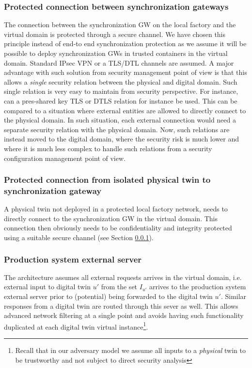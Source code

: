 \subsubsection{Protected connection between synchronization gateways} 
\label{dtwinsecurity:arch_protected_connection}
The connection between the synchronization GW on the local factory and the virtual domain is protected through a secure channel. We have chosen this principle instead of end-to end synchronization protection as we assume it will be possible to deploy synchronization GWs in trusted containers in the virtual domain. Standard IPsec \cite{Kent2005} VPN or a TLS/DTL channels \cite{Dierks2008} \cite{rfc6347} are assumed. A major advantage with such solution from security management point of view is that this allows a \emph{single} security relation between the physical and digital domain. Such single relation is very easy to maintain from security perspective. For instance, can a pres-shared key TLS or DTLS relation for instance be used. This can be compared to a situation where external entities are allowed to directly connect to the physical domain. In such situation, each external connection would need a separate security relation with the physical domain. Now, such relations are instead moved to the digital domain, where the security risk is much lower and where it is much less complex to handle such relations from a security configuration management point of view.
\subsubsection{Protected connection from isolated physical twin to synchronization gateway}
A physical twin not deployed in a protected local factory network, needs to directly connect to the synchronization GW in the virtual domain. This connection then obviously needs to be confidentiality and integrity protected using a suitable secure channel (see Section \ref{dtwinsecurity:arch_protected_connection}).
\subsubsection{Production system external server}
The architecture assumes all external requests arrives in the virtual domain, i.e. external input to digital twin $u'$ from the set $I_{u'}$ arrives to the production system external server prior to (potential) being forwarded to the digital twin $u'$. Similar responses from a digital twin are routed through this sever as well. This allows advanced network filtering at a single point and avoids having such functionality duplicated at each digital twin virtual instance\footnote{Recall that in our adversary model we assume all inputs to a \textit{physical} twin to be trustworthy and not subject to direct security analysis}.
